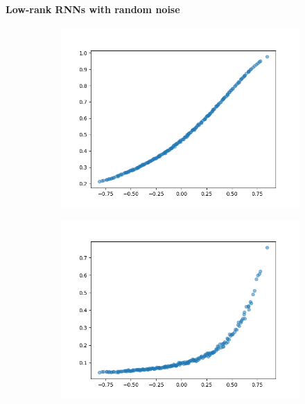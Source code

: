 \documentclass[11pt]{article}
\begin{document}
	\paragraph{Low-rank RNNs with random noise}
		\begin{figure}[H]
			\centering
			\begin{subfigure}[b]{0.45\textwidth}
				\centering
				\includegraphics[width=\textwidth]{../figures/ttc_low_rank_sym_with_noise.png}
				\caption{}
			\end{subfigure}
			\hfill
			\begin{subfigure}[b]{0.45\textwidth}
				\centering
				\includegraphics[width=\textwidth]{../figures/its_low_rank_sym_with_noise.png}

\end{subfigure}
\end{figure}
\end{document}

